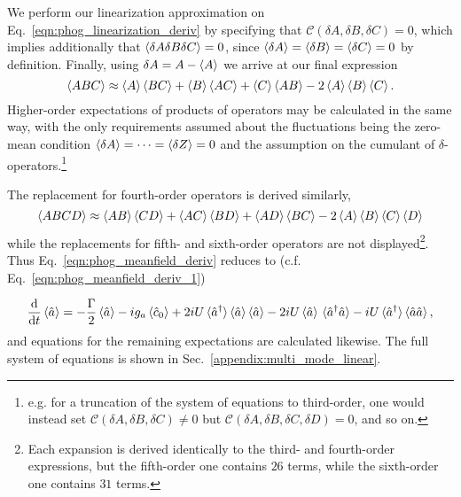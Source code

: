\noindent We perform our linearization approximation on Eq.~\ref{eqn:phog_linearization_deriv} by specifying that $\mathcal{C}\left(\delta A, \delta B, \delta C \right) = 0$, which implies additionally that $\ev{\delta A \delta B \delta C} = 0$, since $\ev{\delta A} = \ev{\delta B} = \ev{\delta C} = 0$ by definition. Finally, using $\delta A = A - \ev{A}$ we arrive at our final expression
\begin{equation}\label{eqn:linearization_3}
\ev{A B C} \approx \ev{A} \ev{B C} + \ev{B} \ev{A C} + \ev{C} \ev{A B} - 2 \ev{A} \ev{B} \ev{C}.
\end{equation}
Higher-order expectations of products of operators may be calculated in the same way, with the only requirements assumed about the fluctuations being the zero-mean condition $\ev{\delta A} = \dots = \ev{\delta Z} = 0$ and the assumption on the cumulant of $\delta$-operators.\footnote{e.g. for a truncation of the system of equations to third-order, one would instead set $\mathcal{C}\left(\delta A, \delta B, \delta C\right) \ne 0$ but $\mathcal{C}\left(\delta A, \delta B, \delta C , \delta D\right) = 0$, and so on.}

The replacement for fourth-order operators is derived similarly,
\begin{equation}
\ev{A B C D} \approx \ev{A B}\ev{C D} + \ev{A C}\ev{B D} + \ev{A D}\ev{B C} - 2 \ev{A}\ev{B}\ev{C}\ev{D}
\end{equation}
while the replacements for fifth- and sixth-order operators are not displayed\footnote{Each expansion is derived identically to the third- and fourth-order expressions, but the fifth-order one contains $26$ terms, while the sixth-order one contains $31$ terms.}. Thus Eq.~\ref{eqn:phog_meanfield_deriv} reduces to (c.f. Eq.~\ref{eqn:phog_meanfield_deriv_1})

\begin{equation}
\ddt \ev{\hat{a}} = - \frac{\Gamma}{2} \ev{\hat{a}} - i g_a \ev{\hat{c}_0} + 2 i U \ev*{\hat{a}^\dagger}\ev{\hat{a}}\ev{\hat{a}} - 2 i U \ev{\hat{a}}\ev*{\hat{a}^\dagger \hat{a}} - i U \ev*{\hat{a}^\dagger} \ev{\hat{a} \hat{a}},
\end{equation}
and equations for the remaining expectations are calculated likewise. The full system of equations is shown in Sec.~\ref{appendix:multi_mode_linear}.




